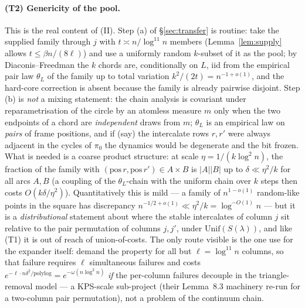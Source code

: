 \paragraph{(T2) Genericity of the pool.}
This is the real content of (II).  Step (a) of \S\ref{sec:transfer}
is routine: take the supplied family through $j$ with
$t\asymp n/\log^{11}n$ members (Lemma~\ref{lem:supply} allows
$t\le\beta n/(8\ell)$) and use a uniformly random $k$-subset of it as
the pool; by Diaconis--Freedman the $k$ chords are, conditionally on
$L$, iid from the empirical pair law $\theta_L$ of the family up to
total variation $k^2/(2t)=n^{-1+o(1)}$, and the hard-core correction
is absent because the family is already pairwise disjoint.  Step (b)
is \emph{not} a mixing statement: the chain analysis is covariant
under reparametrisation of the circle by an atomless measure $m$
only when the two endpoints of a chord are \emph{independent} draws
from $m$; $\theta_L$ is an empirical law on \emph{pairs} of frame
positions, and if (say) the intercalate rows $r,r'$ were always
adjacent in the cycles of $\pi_0$ the dynamics would be degenerate
and the bit frozen.  What is needed is a coarse product structure:
at scale $\eta=1/(k\log^2n)$, the fraction of the family with
$(\mathrm{pos}\,r,\mathrm{pos}\,r')\in A\times B$ is $|A||B|$ up to
$\delta\ll\eta^2/k$ for all arcs $A,B$ (a coupling of the
$\theta_L$-chain with the uniform chain over $k$ steps then costs
$O(k\delta/\eta^2)$).  Quantitatively this is mild --- a family of
$n^{1-o(1)}$ random-like points in the square has discrepancy
$n^{-1/2+o(1)}\ll\eta^2/k=\log^{-O(1)}n$ --- but it is a
\emph{distributional} statement about where the stable intercalates
of column $j$ sit relative to the pair permutation of columns
$j,j'$, under $\mathrm{Unif}(S(\lambda))$, and like (T1) it is out
of reach of union-of-costs.  The only route visible is the one
\cite{KPS25} use for the expander itself: demand the property for
all but $\ell=\log^{11}n$ columns, so that failure requires $\ell$
simultaneous failures and costs $e^{-\ell\cdot n\delta^2/\mathrm{polylog}}
=e^{-\omega(n\log^2n)}$ \emph{if} the per-column failures decouple
in the triangle-removal model --- a KPS-scale sub-project (their
Lemma~8.3 machinery re-run for a two-column pair permutation), not a
problem of the continuum chain.


